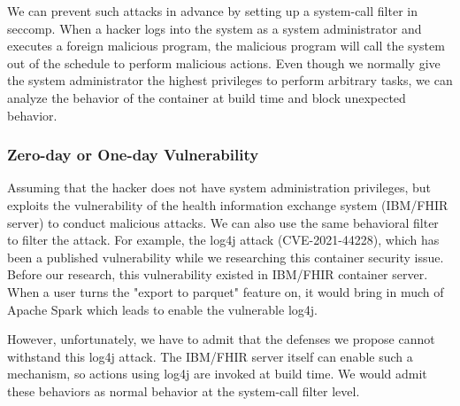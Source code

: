 We can prevent such attacks in advance by setting up a system-call filter
in seccomp. When a hacker logs into the system as a system administrator
and executes a foreign malicious program, the malicious program will call
the system out of the schedule to perform malicious actions.
Even though we normally give the system administrator the highest privileges
to perform arbitrary tasks, we can analyze the behavior of the container
at build time and block unexpected behavior.

\subsubsection{Zero-day or One-day Vulnerability}
Assuming that the hacker does not have system administration privileges,
but exploits the vulnerability of the health information exchange system
(IBM/FHIR server) to conduct malicious attacks. We can also use the same
behavioral filter to filter the attack.
For example, the log4j attack (CVE-2021-44228), which has been a published
vulnerability while we researching this container security issue.
Before our research, this vulnerability existed in IBM/FHIR container server.
When a user turns the "export to parquet" feature on, it would
bring in much of Apache Spark which leads to enable the vulnerable log4j.

However, unfortunately, we have to admit that the defenses we propose cannot
withstand this log4j attack. The IBM/FHIR server itself can enable such a mechanism,
so actions using log4j are invoked at build time. We would admit these
behaviors as normal behavior at the system-call filter level.




